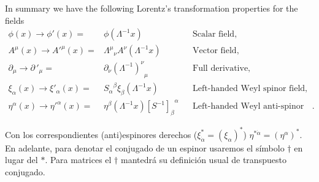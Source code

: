 \begin{frame}
In summary we have the following Lorentz's transformation properties for the fields
\begin{align}
   \phi(x)\to \phi'(x)=&\phi(\Lambda^{-1}x) && \text{Scalar field,}\nonumber\\
   A^\mu(x)\to {A'}^\mu(x)=&{\Lambda^\mu}_\nu A^\nu(\Lambda^{-1}x)&&\text{Vector field,}\nonumber\\
  \partial_{\mu}\to {\partial\,}'_\mu=& \partial_\nu{\left(\Lambda^{-1}\right)^\nu}_\mu &&\text{Full derivative,}\nonumber\\
  \xi_\alpha(x)\to\xi'_\alpha(x)=&{S_\alpha}^\beta\xi_\beta(\Lambda^{-1}x)
                           && \text{Left-handed Weyl spinor field,}\nonumber\\
  \eta^{\alpha}(x)\to {\eta'}^{\alpha}(x) =&\eta^\beta(\Lambda^{-1}x){\left[  S^{-1}  \right]_{\beta}}^{\alpha} && \text{Left-handed  Weyl anti-spinor field}\,.
 \end{align}
\end{frame}
Con los correspondientes (anti)espinores derechos ($\xi_{\dot{\alpha}}^{*}=\left( \xi_\alpha \right)^{*}$) $\eta^{* \dot{\alpha}}=\left( \eta^{\alpha} \right)^{*}$. En adelante, para denotar el conjugado de un espinor usaremos el símbolo $\dagger$ en lugar del $*$. Para matrices el $\dagger$ mantedrá su definición usual de transpuesto conjugado.

